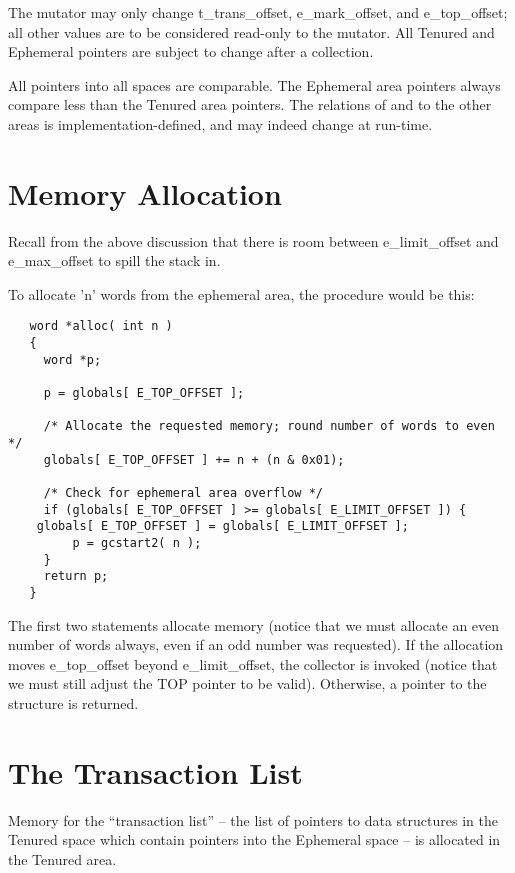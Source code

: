 The mutator may only change {\sc t\_trans\_offset}, {\sc e\_mark\_offset},
and {\sc e\_top\_offset}; all other values are to be considered read-only to
the mutator. All Tenured and Ephemeral pointers are subject to change after
a collection.

All pointers into all spaces are comparable. The Ephemeral area pointers
always compare less than the Tenured area pointers. The relations of and to
the other areas is implementation-defined, and may indeed change at run-time.

\section{Memory Allocation}

Recall from the above discussion that there is room between {\sc
e\_limit\_offset} and {\sc e\_max\_offset} to spill the stack in.

To allocate 'n' words from the ephemeral area, the procedure would be this:

\begin{minipage}{\linewidth}
\begin{verbatim}
   word *alloc( int n )
   {
     word *p;

     p = globals[ E_TOP_OFFSET ];

     /* Allocate the requested memory; round number of words to even */
     globals[ E_TOP_OFFSET ] += n + (n & 0x01);

     /* Check for ephemeral area overflow */
     if (globals[ E_TOP_OFFSET ] >= globals[ E_LIMIT_OFFSET ]) {
	globals[ E_TOP_OFFSET ] = globals[ E_LIMIT_OFFSET ];
         p = gcstart2( n );
     }
     return p;
   }
\end{verbatim}
\end{minipage}

The first two statements allocate memory (notice that we must allocate an
even number of words always, even if an odd number was requested).  If the
allocation moves {\sc e\_top\_offset} beyond {\sc e\_limit\_offset}, the
collector is invoked (notice that we must still adjust the TOP pointer to be
valid).  Otherwise, a pointer to the structure is returned.


\section{The Transaction List}

Memory for the ``transaction list'' -- the list of pointers to data
structures in the Tenured space which contain pointers into the Ephemeral
space -- is allocated in the Tenured area.

